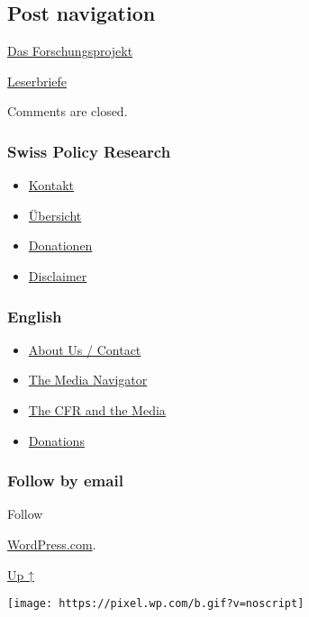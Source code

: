 \hypertarget{post-navigation}{%
\subsection{Post navigation}\label{post-navigation}}

\href{https://swprs.org/2017/03/01/das-forschungsprojekt/}{Das
Forschungsprojekt}

\href{https://swprs.org/2017/03/01/leserbriefe/}{Leserbriefe}

Comments are closed.

\hypertarget{swiss-policy-research}{%
\subsubsection{Swiss Policy Research}\label{swiss-policy-research}}

\begin{itemize}
\tightlist
\item
  \href{https://swprs.org/kontakt/}{Kontakt}
\item
  \href{https://swprs.org/uebersicht/}{Übersicht}
\item
  \href{https://swprs.org/donationen/}{Donationen}
\item
  \href{https://swprs.org/disclaimer/}{Disclaimer}
\end{itemize}

\hypertarget{english}{%
\subsubsection{English}\label{english}}

\begin{itemize}
\tightlist
\item
  \href{https://swprs.org/contact/}{About Us / Contact}
\item
  \href{https://swprs.org/media-navigator/}{The Media Navigator}
\item
  \href{https://swprs.org/the-american-empire-and-its-media/}{The CFR
  and the Media}
\item
  \href{https://swprs.org/donations/}{Donations}
\end{itemize}

\hypertarget{follow-by-email}{%
\subsubsection{Follow by email}\label{follow-by-email}}

Follow

\href{https://wordpress.com/?ref=footer_custom_com}{WordPress.com}.

\protect\hyperlink{}{Up ↑}

\texttt{[image: https://pixel.wp.com/b.gif?v=noscript]}
